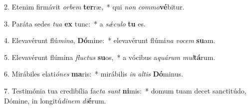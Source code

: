 2. Etenim firmávit \textit{or}\textit{bem} \textbf{ter}ræ,~*  qui \textit{non} \textit{com}\textit{mo}\textbf{vé}bitur.\

3. Paráta sedes \textit{tu}\textit{a} \textbf{ex} tunc:~*  a \textit{sǽ}\textit{cu}\textit{lo} \textbf{tu} es.\

4. Elevavérunt flú\textit{mi}\textit{na}, \textbf{Dó}mine:~*  elevavérunt flúmi\textit{na} \textit{vo}\textit{cem} \textbf{su}am.\

5. Elevavérunt flúmina \textit{fluc}\textit{tus} \textbf{su}os,~*  a vócibus a\textit{quá}\textit{rum} \textit{mul}\textbf{tá}rum.\

6. Mirábiles elati\textit{ó}\textit{nes} \textbf{ma}ris:~*  mirábilis \textit{in} \textit{al}\textit{tis} \textbf{Dó}minus.\

7. Testimónia tua credibília fac\textit{ta} \textit{sunt} \textbf{ni}mis:~*  domum tuam decet sanctitúdo, Dómine, in longitú\textit{di}\textit{nem} \textit{di}\textbf{é}rum.\

